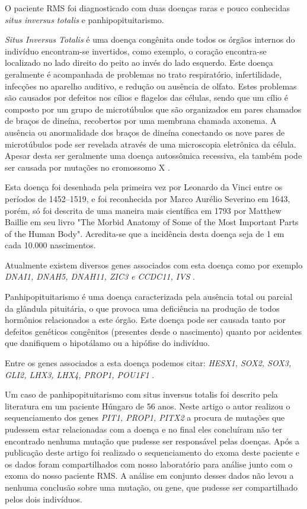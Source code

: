 O paciente RMS foi diagnosticado com duas doenças raras e pouco conhecidas \textit{situs inversus totalis} e panhipopituitarismo. 

\textit{Situs Inversus Totalis} é uma doença congênita onde todos os órgãos internos do indivíduo encontram-se invertidos, como exemplo, o coração encontra-se localizado no lado direito do peito ao invés do lado esquerdo. Este doença geralmente é acompanhada de problemas no trato respiratório, infertilidade, infecções no aparelho auditivo, e redução ou ausência de olfato. Estes problemas são causados por defeitos nos cílios e flagelos das células, sendo que um cílio é composto por um grupo de microtúbulos que são organizados em pares chamados de braços de dineína, recobertos por uma membrana chamada axonema. A ausência ou anormalidade dos braços de dineína conectando os nove pares de microtúbulos pode ser revelada através de uma microscopia eletrônica da célula. Apesar desta ser geralmente uma doença autossômica recessiva, ela também pode ser causada por mutações no cromossomo X \cite{Gebbia1997}.

Esta doença foi desenhada pela primeira vez por Leonardo da Vinci entre os períodos de 1452–1519, e foi reconhecida por Marco Aurélio Severino em 1643, porém, só foi descrita de uma maneira mais científica em 1793 por Matthew Baillie em seu livro "The Morbid Anatomy of Some of the Most Important Parts of the Human Body". Acredita-se que a incidência desta doença seja de 1 em cada 10.000 nascimentos. \cite{Report,Halasz2008}

Atualmente existem diversos genes associados com esta doença como por exemplo \textit{DNAI1, DNAH5, DNAH11, ZIC3 e CCDC11, IVS} \cite{Neesen2001,Olbrich2002, Bartoloni2002, Gebbia1997, Perles2012}.

Panhipopituitarismo é uma doença caracterizada pela ausência total ou parcial da glândula pituitária, o que provoca uma deficiência na produção de todos hormônios relacionados a este órgão. Este doença pode ser causada tanto por defeitos genéticos congênitos (presentes desde o nascimento) quanto por acidentes que danifiquem o hipotálamo ou a hipófise do indivíduo.

Entre os genes associados a esta doença podemos citar: \textit{HESX1, SOX2, SOX3, GLI2, LHX3, LHX4, PROP1, POU1F1} \cite{Viaroli2012}.

Um caso de panhipopituitarismo com situs inversus totalis foi descrito pela literatura em um paciente Húngaro de 56 anos\cite{Halasz2008}. Neste artigo o autor realizou o sequenciamento dos genes \textit{PIT1, PROP1, PITX2} a procura de mutações que pudessem estar relacionadas com a doença e no final eles concluíram não ter encontrado nenhuma mutação que pudesse ser responsável pelas doenças. Após a publicação deste artigo foi realizado o sequenciamento do exoma deste paciente e os dados foram compartilhados com nosso laboratório para análise junto com o exoma do nosso paciente RMS. A análise em conjunto desses dados não levou a nenhuma conclusão sobre uma mutação, ou gene, que pudesse ser compartilhado pelos dois indivíduos.


